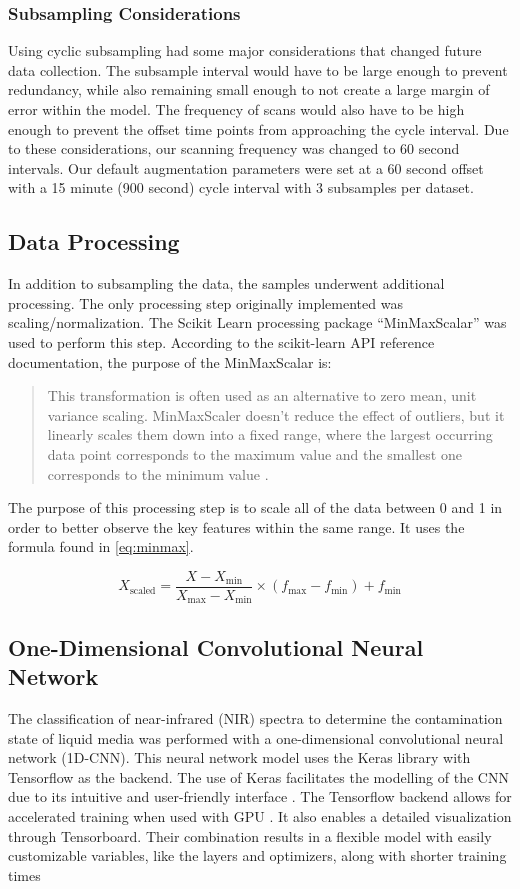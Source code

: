 \documentclass[final, 3p, 11pt]{elsarticle}
\begin{document}
\subsubsection{Subsampling Considerations}
Using cyclic subsampling had some major considerations that changed future data collection. The subsample interval would have to be large enough to prevent redundancy, while also remaining small enough to not create a large margin of error within the model. The frequency of scans would also have to be high enough to prevent the offset time points from approaching the cycle interval. Due to these considerations, our scanning frequency was changed to 60 second intervals. Our default augmentation parameters were set at a 60 second offset with a 15 minute (900 second) cycle interval with 3 subsamples per dataset.

\subsection{Data Processing}
In addition to subsampling the data, the samples underwent additional processing. The only processing step originally implemented was scaling/normalization. The Scikit Learn processing package “MinMaxScalar” was used to perform this step. According to the scikit-learn API reference documentation, the purpose of the MinMaxScalar is:
\begin{quote}
This transformation is often used as an alternative to zero mean, unit variance scaling. MinMaxScaler doesn’t reduce the effect of outliers, but it linearly scales them down into a fixed range, where the largest occurring data point corresponds to the maximum value and the smallest one corresponds to the minimum value \citep{ScikitLearnAPI}.
\end{quote}
The purpose of this processing step is to scale all of the data between 0 and 1 in order to better observe the key features within the same range. It uses the formula found in \autoref{eq:minmax}.

\begin{equation}
X_{\text{scaled}} = \frac{X - X_{\text{min}}}{X_{\text{max}} - X_{\text{min}}} \times (f_{\text{max}} - f_{\text{min}}) + f_{\text{min}}
\label{eq:minmax}
\end{equation}

\subsection{One-Dimensional Convolutional Neural Network}
The classification of near-infrared (NIR) spectra to determine the contamination state of liquid media was performed with a one-dimensional convolutional neural network (1D-CNN). This neural network model uses the Keras library with Tensorflow as the backend. The use of Keras facilitates the modelling of the CNN due to its intuitive and user-friendly interface \citep{kerasteam_keras}. The Tensorflow backend allows for accelerated training when used with GPU \cite{acecloudteam_2024_tensorflow}. It also enables a detailed visualization through Tensorboard. Their combination results in a flexible model with easily customizable variables, like the layers and optimizers, along with shorter training times
\end{document}
